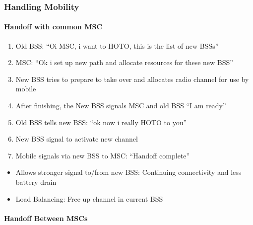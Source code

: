 \documentclass[a4paper]{article}
\begin{document}
\subsubsection{Handling Mobility}
\paragraph{Handoff with common MSC}
\begin{enumerate}
    \item Old BSS: ``Oi MSC, i want to HOTO, this is the list of new BSSs''
    \item MSC: ``Ok i set up new path and allocate resources for these new BSS''
    \item New BSS tries to prepare to take over and allocates radio channel for use by mobile
    \item After finishing, the New BSS signals MSC and old BSS ``I am ready''
    \item Old BSS tells new BSS: ``ok now i really HOTO to you''
    \item New BSS signal to activate new channel
    \item Mobile signals via new BSS to MSC: ``Handoff complete''
\end{enumerate}
\medskip
\begin{itemize}[label=\textcolor{OliveGreen}{\Large\checkmark}]
    \item Allows stronger signal to/from new BSS: Continuing connectivity and less battery drain
    \item Load Balancing: Free up channel in current BSS
\end{itemize}

\paragraph{Handoff Between MSCs}\mbox{}
\end{document}
